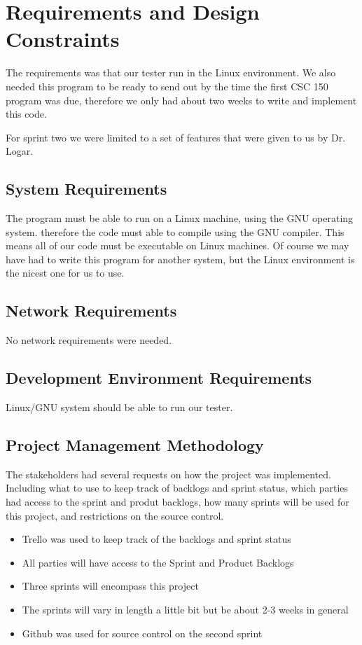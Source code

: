 \section{Requirements and Design Constraints}
The requirements was that our tester run in the Linux environment.   We also needed this 
program to be ready to send out by the time the first CSC 150 program was due, therefore
we only had about two weeks to write and implement this code.

For sprint two we were limited to a set of features that were given to us by Dr. Logar.


\subsection{System  Requirements}
The program must be able to run on a Linux machine, using the GNU operating system.   
therefore the code must able to compile using the GNU compiler.   This means all of our
code must be executable on Linux machines.   Of course we may have had to write this
program for another system, but the Linux environment is the nicest one for us to use.


\subsection{Network Requirements}
No network requirements were needed.


\subsection{Development Environment Requirements}
Linux/GNU system should be able to run our tester. 


\subsection{Project  Management Methodology}
The stakeholders had several requests on how the project was implemented. Including 
what to use to keep track of backlogs and sprint status, which parties had access to the
sprint and produt backlogs, how many sprints will be used for this project, and restrictions
on the source control.
 
\begin{itemize}
\item Trello was used to keep track of the backlogs and sprint status
\item All parties will have access to the Sprint and Product Backlogs
\item Three sprints will encompass this project
\item The sprints will vary in length a little bit but be about 2-3 weeks in general
\item Github was used for source control on the second sprint
\end{itemize}

